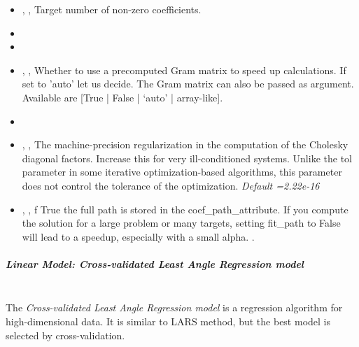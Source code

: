 \begin{itemize}
  \item {} , ,
  Target number of non-zero coefficients.
  \item {}
  \item \verDescriptionA
  \item {} , ,
  Whether to use a precomputed Gram matrix to speed up calculations.
  If set to 'auto' let us decide.
  The Gram matrix can also be passed as argument.
  Available are [True | False | ‘auto’ | array-like].
  \item {}
  \item {} , ,
  The machine-precision regularization in the computation of the Cholesky
  diagonal factors.
  Increase this for very ill-conditioned systems.
  Unlike the tol parameter in some iterative optimization-based algorithms, this
  parameter does not control the tolerance of the optimization.
  \textit{Default =2.22e-16}
  \item {} , ,
  f True the full path is stored in the coef\_path\_attribute.
  If you compute the solution for a large problem or many targets, setting
  fit\_path to False will lead to a speedup, especially with a small alpha.
  .
\end{itemize}
\subparagraph{Linear Model: Cross-validated Least Angle Regression model}
\mbox{}
\\The \textit{Cross-validated Least Angle Regression model} is a regression
algorithm for high-dimensional data.
%
It is similar to LARS method, but the best model is selected by
cross-validation.
%
